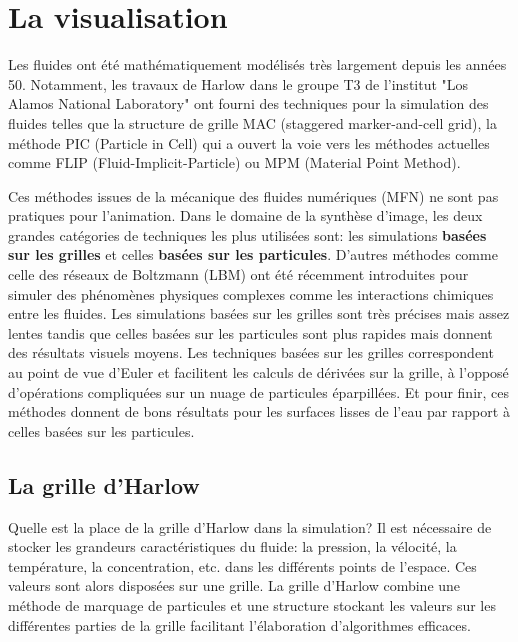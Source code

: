 \documentclass[11pt]{article}
\begin{document}
\section{La visualisation}

Les fluides ont été mathématiquement modélisés très largement depuis les années 50. Notamment, les travaux de  Harlow \cite{harlow-65} dans le groupe T3 de l'institut "Los Alamos National Laboratory" ont fourni des techniques pour la simulation des fluides telles que la structure de grille MAC (staggered marker-and-cell grid), la méthode PIC (Particle in Cell) qui a ouvert la voie vers les méthodes actuelles comme FLIP (Fluid-Implicit-Particle) ou MPM (Material Point Method).

Ces méthodes issues de la mécanique des fluides numériques (MFN) ne sont pas pratiques pour l'animation. Dans le domaine de la synthèse d'image, les deux grandes catégories de techniques les plus utilisées sont: les simulations \textbf{basées sur les grilles} et celles \textbf{basées sur les particules}. D'autres méthodes comme celle des réseaux de Boltzmann (LBM) ont été récemment introduites pour simuler des phénomènes physiques complexes comme les interactions chimiques entre les fluides. 
Les simulations basées sur les grilles sont très précises mais assez lentes tandis que celles basées sur les particules sont plus rapides mais donnent des résultats visuels moyens. Les techniques basées sur les grilles correspondent au point de vue d'Euler et facilitent les calculs de dérivées sur la grille, à l'opposé d'opérations compliquées sur un nuage de particules éparpillées. Et pour finir, ces méthodes donnent de bons résultats pour les surfaces lisses de l'eau par rapport à celles basées sur les particules.

\subsection{La grille d'Harlow}

Quelle est la place de la grille d'Harlow\cite{harlow-65} dans la simulation?  Il est nécessaire de stocker les grandeurs caractéristiques du fluide: la pression, la vélocité, la température, la concentration, etc. dans les différents points de l'espace. Ces valeurs sont alors disposées sur une grille. La grille d'Harlow combine une méthode de marquage de particules et une structure stockant les valeurs sur les différentes parties de la grille facilitant l'élaboration d'algorithmes efficaces.
\end{document}
